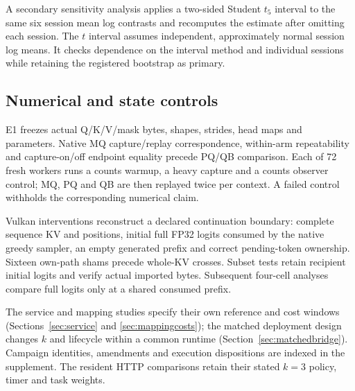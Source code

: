 A secondary sensitivity analysis applies a two-sided Student $t_5$ interval to the same six session mean log contrasts and recomputes the estimate after omitting each session. The $t$ interval assumes independent, approximately normal session log means. It checks dependence on the interval method and individual sessions while retaining the registered bootstrap as primary.

\subsection{Numerical and state controls}
E1 freezes actual Q/K/V/mask bytes, shapes, strides, head maps and parameters. Native MQ capture/replay correspondence, within-arm repeatability and capture-on/off endpoint equality precede PQ/QB comparison. Each of 72 fresh workers runs a counts warmup, a heavy capture and a counts observer control; MQ, PQ and QB are then replayed twice per context. A failed control withholds the corresponding numerical claim.

Vulkan interventions reconstruct a declared continuation boundary: complete sequence KV and positions, initial full FP32 logits consumed by the native greedy sampler, an empty generated prefix and correct pending-token ownership. Sixteen own-path shams precede whole-KV crosses. Subset tests retain recipient initial logits and verify actual imported bytes. Subsequent four-cell analyses compare full logits only at a shared consumed prefix.

The service and mapping studies specify their own reference and cost windows (Sections~\ref{sec:service} and \ref{sec:mappingcosts}); the matched deployment design changes $k$ and lifecycle within a common runtime (Section~\ref{sec:matchedbridge}). Campaign identities, amendments and execution dispositions are indexed in the supplement. The resident HTTP comparisons retain their stated $k=3$ policy, timer and task weights.
